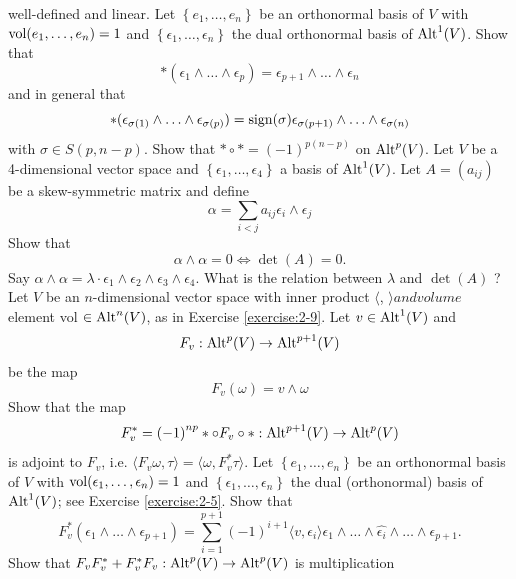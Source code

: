 \begin{enumerate}[\theexercise.1]
    well-defined and linear.
    Let $\left\{  {{e}_{1},\ldots,{e}_{n}}\right\}$ be an orthonormal basis of $V$ with $\mathrm{vol}( {{e}_{1},\ldots,{e}_{n}}) = 1$
    and $\left\{  {{\epsilon }_{1},\ldots,{\epsilon }_{n}}\right\}$ the dual orthonormal basis of ${\operatorname{Alt}}^{1}( V)$.
    Show that
    \[
      * ( {{\epsilon }_{1} \land  \ldots  \land  {\epsilon }_{p}})
      = {\epsilon }_{p + 1} \land  \ldots  \land  {\epsilon }_{n}
    \]
    and in general that
    \[
      * ( {{\epsilon }_{\sigma ( 1) } \land  \ldots  \land  {\epsilon }_{\sigma ( p) }})
      = \mathrm{sign}( \sigma ) {\epsilon }_{\sigma ( {p + 1}) } \land  \ldots  \land  {\epsilon }_{\sigma ( n) }
    \]
    with $\sigma  \in  S( {p,n- p})$. Show that $*\circ *= {(-1) }^{p( {n- p}) }$ on ${\operatorname{Alt}}^{p}( V)$.
  \NewItem Let $V$ be a 4-dimensional vector space and $\left\{  {{\epsilon }_{1},\ldots,{\epsilon }_{4}}\right\}$ a
    basis of ${\operatorname{Alt}}^{1}( V)$. Let $A = ( {a}_{ij})$ be a skew-symmetric matrix and define
    \[
      \alpha  = \sum_{{i < j}}{a}_{ij}{\epsilon }_{i} \land  {\epsilon }_{j}
    \]
    Show that
    \[
      \alpha  \land  \alpha  = 0 \Leftrightarrow  \det ( A)  = 0.
    \]
    Say $\alpha  \land  \alpha  = \lambda  \cdot  {\epsilon }_{1} \land  {\epsilon }_{2} \land  {\epsilon }_{3} \land  {\epsilon }_{4}$. What is the relation between $\lambda$ and $\det ( A)$ ? Let $V$ be an $n$-dimensional vector space with inner product $\langle$, $\rangle {andvolume}$ element vol $\in  {\operatorname{Alt}}^{n}( V)$, as in Exercise \ref{exercise:2-9}. Let $v \in  {\operatorname{Alt}}^{1}( V)$ and
    \[
      {F}_{v} : {\operatorname{Alt}}^{p}( V)  \rightarrow  {\operatorname{Alt}}^{p + 1}( V)
    \]
    be the map
    \[
      {F}_{v}( \omega )  = v \land  \omega
    \]
    Show that the map
    \[
      {F}_{v}^* = {(-1) }^{np} *  \circ  {F}_{v} \circ   *  : {\operatorname{Alt}}^{p + 1}( V)  \rightarrow  {\operatorname{Alt}}^{p}( V)
    \]
    is adjoint to ${F}_{v}$, i.e. $\langle  {{F}_{v}\omega,\tau }\rangle   = \langle  {\omega,{F}_{v}^*\tau }\rangle$.
    Let $\left\{  {{e}_{1},\ldots,{e}_{n}}\right\}$ be an orthonormal basis of $V$ with $\mathrm{vol}( {{\epsilon }_{1},\ldots,{\epsilon }_{n}}) = 1$
    and $\left\{  {{\epsilon }_{1},\ldots,{\epsilon }_{n}}\right\}$ the dual (orthonormal) basis of ${\operatorname{Alt}}^{1}( V)$;
    see Exercise \ref{exercise:2-5}. Show that
    \[
      {F}_{v}^*( {{\epsilon }_{1} \land  \ldots  \land  {\epsilon }_{p + 1}})
      = \sum_{i=1}^{p + 1}{(-1) }^{i + 1}\langle  {v,{\epsilon }_{i}}\rangle  {\epsilon }_{1}
      \land  \ldots  \land  \widehat{{\epsilon }_{i}}
      \land  \ldots  \land  {\epsilon }_{p + 1}.
    \]
    Show that ${F}_{v}{F}_{v}^* + {F}_{v}^*{F}_{v} : {\operatorname{Alt}}^{p}( V)  \rightarrow  {\operatorname{Alt}}^{p}( V)$ is multiplication

\end{enumerate}
